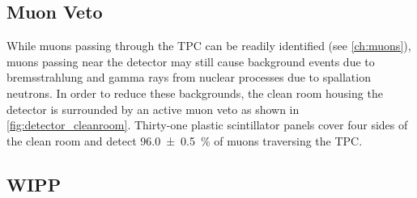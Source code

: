 \documentclass[herrin-thesis.tex]{subfiles}
\begin{document}
\subsection{Muon Veto}
While muons passing through the TPC can be readily identified (see \cref{ch:muons}), muons passing near the detector may still cause background events due to bremsstrahlung and gamma rays from nuclear processes due to spallation neutrons. In order to reduce these backgrounds, the clean room housing the detector is surrounded by an active muon veto as shown in \cref{fig:detector_cleanroom}. Thirty-one plastic scintillator panels cover four sides of the clean room and detect \SI{96.0\pm0.5}{\%} of muons traversing the TPC.

\subsection{WIPP}
\end{document}
